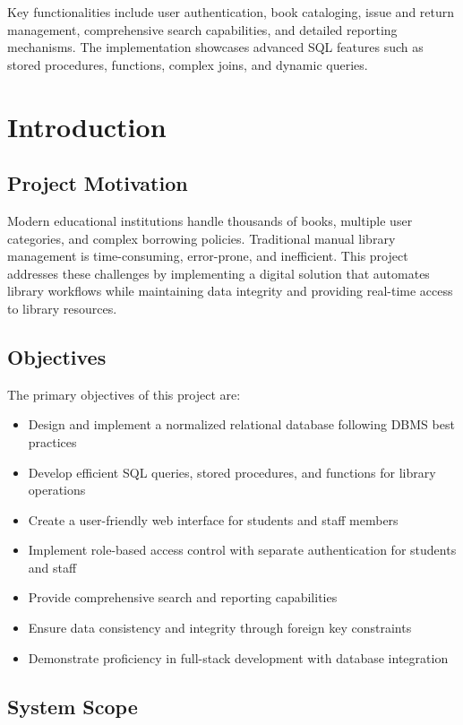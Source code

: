 \documentclass[12pt,a4paper]{article}
\begin{document}
Key functionalities include user authentication, book cataloging, issue and return management, comprehensive search capabilities, and detailed reporting mechanisms. The implementation showcases advanced SQL features such as stored procedures, functions, complex joins, and dynamic queries.

\section{Introduction}

\subsection{Project Motivation}

Modern educational institutions handle thousands of books, multiple user categories, and complex borrowing policies. Traditional manual library management is time-consuming, error-prone, and inefficient. This project addresses these challenges by implementing a digital solution that automates library workflows while maintaining data integrity and providing real-time access to library resources.

\subsection{Objectives}

The primary objectives of this project are:

\begin{itemize}
    \item Design and implement a normalized relational database following DBMS best practices
    \item Develop efficient SQL queries, stored procedures, and functions for library operations
    \item Create a user-friendly web interface for students and staff members
    \item Implement role-based access control with separate authentication for students and staff
    \item Provide comprehensive search and reporting capabilities
    \item Ensure data consistency and integrity through foreign key constraints
    \item Demonstrate proficiency in full-stack development with database integration
\end{itemize}

\subsection{System Scope}
\end{document}
